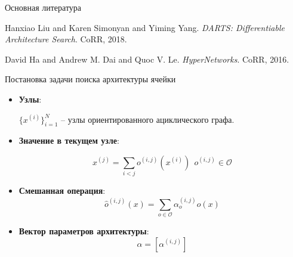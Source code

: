 \documentclass{beamer}
\begin{document}
\begin{frame}{Основная литература}

\begin{thebibliography}{1}


Hanxiao Liu and Karen Simonyan and Yiming Yang. 
\textit{DARTS: Differentiable Architecture Search}.
CoRR, 2018.

David Ha and Andrew M. Dai and Quoc V. Le.
\textit{HyperNetworks}. 
CoRR, 2016.

\end{thebibliography}			
\end{frame}




\begin{frame}{Постановка задачи поиска архитектуры ячейки}

\begin{itemize}

\item \textbf{Узлы}:

 $\{x^{(i)}\}_{i=1}^N$ -- узлы ориентированного ациклического графа. 

\item \textbf{Значение в текущем узле}:

 $$x^{(j)} = \sum_{i < j}o^{(i, j)}(x^{(i)})~~o^{(i, j)} \in\mathcal{O}$$


\item \textbf{Смешанная операция}: $$\hat{o}^{(i, j)}(x) = \sum_{o\in \mathcal{O}} \alpha_o^{(i, j)}o(x)$$

\item \textbf{Вектор параметров архитектуры}: $$\alpha = [\alpha^{(i, j)}]$$

\end{itemize}
\end{frame}
\end{document}
